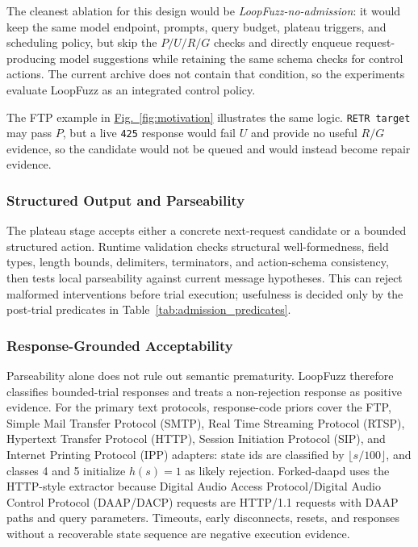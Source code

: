 \documentclass[final,5p,times,number]{elsarticle}
\newcommand{\figref}[1]{\hyperref[#1]{Fig.~\ref*{#1}}}
\begin{document}
The cleanest ablation for this design would be \emph{LoopFuzz-no-admission}: it would keep the same model endpoint, prompts, query budget, plateau triggers, and scheduling policy, but skip the $P/U/R/G$ checks and directly enqueue request-producing model suggestions while retaining the same schema checks for control actions. The current archive does not contain that condition, so the experiments evaluate LoopFuzz as an integrated control policy.

The FTP example in \figref{fig:motivation} illustrates the same logic. \texttt{RETR target} may pass $P$, but a live \texttt{425} response would fail $U$ and provide no useful $R/G$ evidence, so the candidate would not be queued and would instead become repair evidence.

\subsubsection{Structured Output and Parseability}
The plateau stage accepts either a concrete next-request candidate or a bounded structured action. Runtime validation checks structural well-formedness, field types, length bounds, delimiters, terminators, and action-schema consistency, then tests local parseability against current message hypotheses. This can reject malformed interventions before trial execution; usefulness is decided only by the post-trial predicates in Table~\ref{tab:admission_predicates}.

\subsubsection{Response-Grounded Acceptability}
Parseability alone does not rule out semantic prematurity. LoopFuzz therefore classifies bounded-trial responses and treats a non-rejection response as positive evidence. For the primary text protocols, response-code priors cover the FTP, Simple Mail Transfer Protocol (SMTP), Real Time Streaming Protocol (RTSP), Hypertext Transfer Protocol (HTTP), Session Initiation Protocol (SIP), and Internet Printing Protocol (IPP) adapters: state ids are classified by $\lfloor s/100\rfloor$, and classes 4 and 5 initialize $h(s)=1$ as likely rejection. Forked-daapd uses the HTTP-style extractor because Digital Audio Access Protocol/Digital Audio Control Protocol (DAAP/DACP) requests are HTTP/1.1 requests with DAAP paths and query parameters. Timeouts, early disconnects, resets, and responses without a recoverable state sequence are negative execution evidence.
\end{document}
